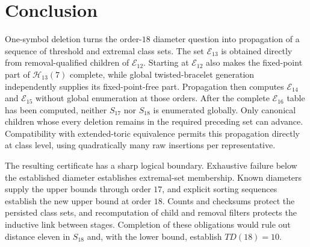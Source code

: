 \documentclass[11pt]{article}
\theoremstyle{definition}
\theoremstyle{remark}
\newcommand{\En}{\mathcal E}
\newcommand{\Hn}{\mathcal H}
\begin{document}
\section{Conclusion}\label{sec:conclusion}

One-symbol deletion turns the order-$18$ diameter question into propagation
of a sequence of threshold and extremal class sets.  The set $\En_{13}$ is
obtained directly from removal-qualified children of $\En_{12}$.  Starting at
$\En_{12}$ also makes the fixed-point part of $\Hn_{13}(7)$ complete, while
global twisted-bracelet generation independently supplies its fixed-point-free
part.  Propagation then computes $\En_{14}$ and $\En_{15}$ without global
enumeration at those orders.  After the complete $\En_{16}$ table has been computed, neither
$S_{17}$ nor $S_{18}$ is enumerated globally.  Only canonical children whose
every deletion remains in the required preceding set can advance.
Compatibility with extended-toric equivalence permits this propagation
directly at class level, using quadratically many raw insertions per
representative.

The resulting certificate has a sharp logical boundary.  Exhaustive failure
below the established diameter establishes extremal-set membership.  Known
diameters supply the upper bounds through order $17$, and explicit sorting
sequences establish the new upper bound at order $18$.  Counts and checksums protect the
persisted class sets, and recomputation of child and removal filters protects
the inductive link between stages.  Completion of these obligations would
rule out distance eleven in $S_{18}$ and, with the lower bound, establish
$TD(18)=10$.



\end{document}
